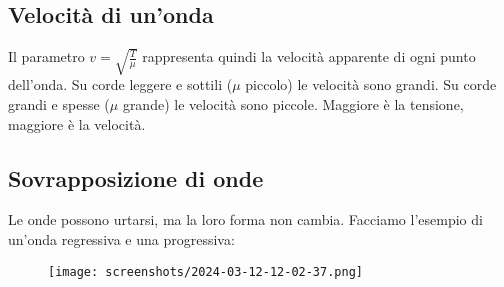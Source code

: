 \subsection{Velocità di un'onda}

Il parametro \(v = \sqrt{\frac{T}{\mu }} \) rappresenta quindi la velocità apparente di ogni punto dell'onda. Su corde leggere e sottili (\(\mu \) piccolo) le velocità sono grandi. Su corde grandi e spesse (\(\mu \) grande) le velocità sono piccole. Maggiore è la tensione, maggiore è la velocità.

\subsection{Sovrapposizione di onde}

Le onde possono urtarsi, ma la loro forma non cambia. Facciamo l'esempio di un'onda regressiva e una progressiva:
\begin{figure}[H]
	\centering
	\texttt{[image: screenshots/2024-03-12-12-02-37.png]}
\end{figure}
